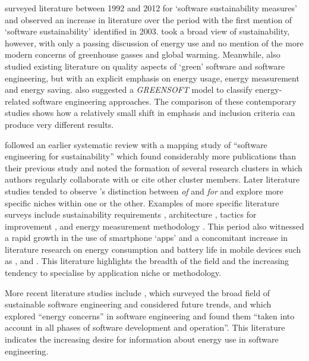 \citet{Calero2013} surveyed literature between 1992 and 2012 for `software sustainability measures' and observed an increase in literature over the period with the first mention of `software sustainability' identified in 2003. \citeauthor{Calero2013} took a broad view of sustainability, however, with only a passing discussion of energy use and no mention of the more modern concerns of greenhouse gasses and global warming. Meanwhile, \citet{Kern2013} also studied existing literature on quality aspects of `green' software and software engineering, but with an explicit emphasis on energy usage, energy measurement and energy saving. \citeauthor{Kern2013} also suggested a \emph{GREENSOFT} model to classify energy-related software engineering approaches. The comparison of these contemporary studies shows how a relatively small shift in emphasis and inclusion criteria can produce very different results.

\citet{Penzenstadler2014a} followed an earlier systematic review \citep{Penzenstadler2012} with a mapping study of \enquote{software engineering for sustainability} which found considerably more publications than their previous study and noted the formation of several research clusters in which authors regularly collaborate with or cite other cluster members. Later literature studies tended to observe \citet{Penzenstadler2013}'s distinction between \emph{of} and \emph{for} and explore more specific niches within one or the other. Examples of more specific literature surveys include sustainability requirements \citep{Chitchyan2016}, architecture \citep{Paradis2021}, tactics for improvement \citep{Balanza-Martinez2023}, and energy measurement methodology \citep{Hindle2016}. This period also witnessed a rapid growth in the use of smartphone `apps' and a concomitant increase in literature research on energy consumption and battery life in mobile devices such as \citet{Ahmad2015}, \citet{Moreira2020} and \citet{Schuler2023}. This literature highlights the breadth of the field and the increasing tendency to specialise by application niche or methodology.

More recent literature studies include \citet{Venters2023}, which surveyed the broad field of sustainable software engineering and considered future trends, and \citet{Lee2024} which explored \enquote{energy concerns} in software engineering and found them \enquote{taken into account in all phases of software development and operation}. This literature indicates the increasing desire for information about energy use in software engineering.

